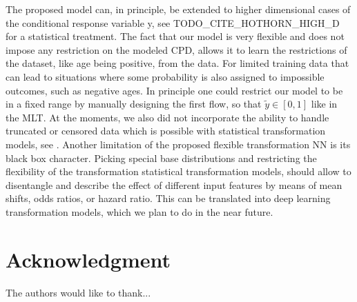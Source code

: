 \documentclass[a4paper,conference]{IEEEtran}
\begin{document}
The proposed model can, in principle, be extended to higher dimensional cases of the conditional response variable y, see TODO\_CITE\_HOTHORN\_HIGH\_D for a statistical treatment. The fact that our model is very flexible and does not impose any restriction on the modeled CPD, allows it to learn the restrictions of the dataset, like age being positive, from the data. For limited training data that can lead to situations where some probability is also assigned to impossible outcomes, such as negative ages. In principle one could restrict our model to be in a fixed range by manually designing the first flow, so that $\tilde y \in [0,1]$ like in the MLT. At the moments, we also did not incorporate the ability to handle truncated or censored data which is possible with statistical transformation models, see \cite{Hothorn2018}. Another limitation of the proposed flexible transformation NN is its black box character. Picking special base distributions and restricting the flexibility of the transformation statistical transformation models, should allow to disentangle and describe the effect of different input features by means of mean shifts, odds ratios, or hazard ratio. This can be translated into deep learning transformation models, which we plan to do in the near future.

\section*{Acknowledgment}
The authors would like to thank...





%
%
\end{document}
